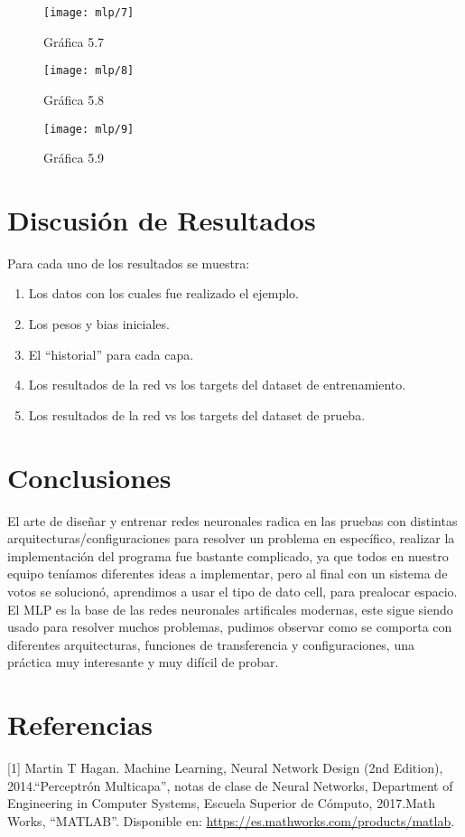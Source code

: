 \documentclass[6pt]{article}
\begin{document}
\begin{figure}[htpb]
	\centering
	\texttt{[image: mlp/7]}
	\caption{Gráfica 5.7}
\end{figure}

\begin{figure}[htpb]
	\centering
	\texttt{[image: mlp/8]}
	\caption{Gráfica 5.8}
\end{figure}

\begin{figure}[htpb]
	\centering
	\texttt{[image: mlp/9]}
	\caption{Gráfica 5.9}
\end{figure}
\newpage

\section{Discusión de Resultados}
Para cada uno de los resultados se muestra:
\begin{enumerate}
	\item Los datos con los cuales fue realizado el ejemplo.
	\item Los pesos y bias iniciales.
	\item El ``historial'' para cada capa.
	\item Los resultados de la red vs los targets del dataset de entrenamiento.
	\item Los resultados de la red vs los targets del dataset de prueba.
\end{enumerate}
\section{Conclusiones}
El arte de diseñar y entrenar redes neuronales radica en las pruebas con distintas arquitecturas/configuraciones para resolver un problema en específico, realizar la implementación del programa fue bastante complicado, ya que todos en nuestro equipo teníamos diferentes ideas a implementar, pero al final con un sistema de votos se solucionó, aprendimos a usar el tipo de dato cell, para prealocar espacio. El MLP es la base de las redes neuronales artificales modernas, este sigue siendo usado para resolver muchos problemas, pudimos observar como se comporta con diferentes arquitecturas, funciones de transferencia y configuraciones, una práctica muy interesante y muy difícil de probar.
\section{Referencias}
[1] Martin T Hagan. Machine Learning, Neural Network Design (2nd Edition), 2014.\newline
[2] ``Perceptrón Multicapa'', notas de clase de Neural Networks, Department of Engineering in Computer Systems, Escuela Superior de Cómputo, 2017.\newline
[3] Math Works, “MATLAB”. Disponible en: \url{https://es.mathworks.com/products/matlab}.
\end{document}
